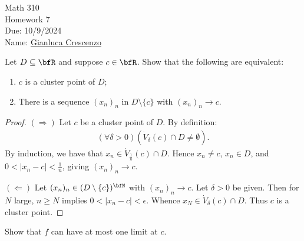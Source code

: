 \documentclass[11pt,twoside,openany]{memoir}
\begin{document}
\begin{center}
{\large Math 310 \\[0.1in]Homework 7 \\[0.1in]
Due: 10/9/2024}\\[.25in]
{Name:} {\underline{Gianluca Crescenzo\hspace*{2in}}}\\[0.15in]
\end{center}
\vspace{4pt}
    \begin{exercise}
        Let $D \subseteq \bfR$ and suppose $c \in \bfR$. Show that the following are equivalent:
            \begin{enumerate}[label = (\roman*)]
                \item $c$ is a cluster point of $D$;
                \item There is a sequence $(x_n)_n$ in $D\setminus \{c\}$ with $(x_n)_n \rightarrow c$.
            \end{enumerate}
    \end{exercise}
        \begin{proof}
            $(\Rightarrow)$ Let $c$ be a cluster point of $D$. By definition:
                \begin{equation*}
                \begin{split}
                    (\forall \delta > 0)(\dot{V}_\delta(c) \cap D \neq \emptyset).
                \end{split}
                \end{equation*}
            By induction, we have that $x_n \in \dot{V}_{\frac{1}{n}}(c) \cap D$. Hence $x_n \neq c$, $x_n \in D$, and $0 < |x_n - c|  < \frac{1}{n}$, giving $(x_n)_n \rightarrow c$. \nl
            
            $(\Leftarrow)$ Let $(x_n)_n \in (D\setminus\{c\})^\bfN$ with $(x_n)_n \rightarrow c$. Let $\delta > 0$ be given. Then for $N$ large, $n \geq N$ implies $0 < |x_n - c| <\epsilon$. Whence $x_N \in \dot{V}_\delta(c) \cap D$. Thus $c$ is a cluster point.
        \end{proof}
    \begin{exercise}
        Show that $f$ can have at most one limit at $c$.
    \end{exercise}
\end{document}
